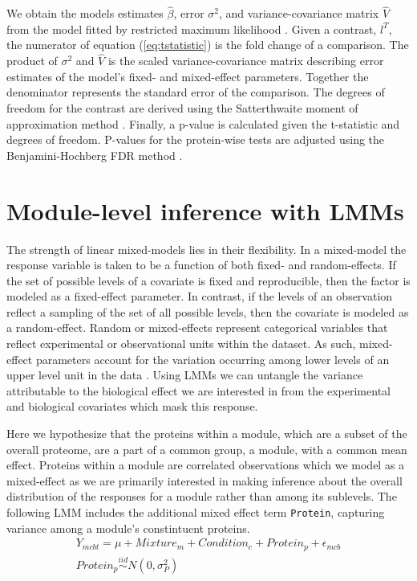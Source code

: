 \documentclass[11pt]{elife}\usepackage[]{graphicx}\usepackage[]{color}
\begin{document}
We obtain the models estimates $\hat{\beta}$, error $\sigma^2$, and
variance-covariance matrix $\hat{V}$ from the model fitted by restricted maximum
likelihood \citep{Bates2015}. Given a contrast, $l^T$, the numerator of equation
(\ref{eq:tstatistic}) is the fold change of a comparison.  The product of
$\sigma^2$ and $\hat{V}$ is the scaled variance-covariance matrix describing
error estimates of the model's fixed- and mixed-effect parameters.  Together the
denominator represents the standard error of the comparison. The degrees of
freedom for the contrast are derived using the Satterthwaite moment of
approximation method \citep{Kuznetsova2017}.  Finally, a p-value is
calculated given the t-statistic and degrees of freedom.  P-values for the
protein-wise tests are adjusted using the Benjamini-Hochberg FDR method
\citep{Huang2020}.\\

\section{Module-level inference with LMMs}

The strength of linear mixed-models lies in their flexibility. In a mixed-model
the response variable is taken to be a function of both fixed- and
random-effects.  If the set of possible levels of a covariate is fixed and
reproducible, then the factor is modeled as a fixed-effect parameter.  In
contrast, if the levels of an observation reflect a sampling of the set of all
possible levels, then the covariate is modeled as a random-effect.  Random or
mixed-effects represent categorical variables that reflect experimental or
observational units within the dataset.  As such, mixed-effect parameters
account for the variation occurring among lower levels of an upper level unit in
the data \citep{Bates2015}.  Using LMMs we can untangle the variance
attributable to the biological effect we are interested in from the experimental
and biological covariates which mask this response.

Here we hypothesize that the proteins within a module, which are a subset of the
overall proteome,  are a part of a common group, a module, with a common mean
effect. Proteins within a module are correlated observations which we model as a
mixed-effect as we are primarily interested in making inference about the
overall distribution of the responses for a module rather than among its
sublevels. The following LMM includes the additional mixed effect term
\texttt{Protein}, capturing variance among a module's constintuent proteins.
\begin{equation} 
  \begin{gathered}\label{eq:fx1} %
	Y_{mcbt} = \mu + Mixture_m + Condition_c + Protein_p + \epsilon_{mcb}\\
	Protein_p \stackrel{iid}{\sim} N(0,\sigma^2_P) \\
  \end{gathered}
\end{equation}
\end{document}
